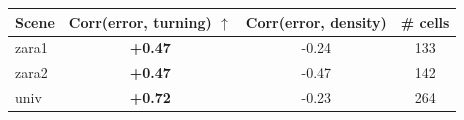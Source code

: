 \begin{tabular}{lccc}
\hline
Scene & Corr(error, turning) $\uparrow$ & Corr(error, density) & \# cells \\
\hline
zara1 & \textbf{+0.47} & -0.24 & 133 \\
zara2 & \textbf{+0.47} & -0.47 & 142 \\
univ & \textbf{+0.72} & -0.23 & 264 \\
\hline
\end{tabular}
